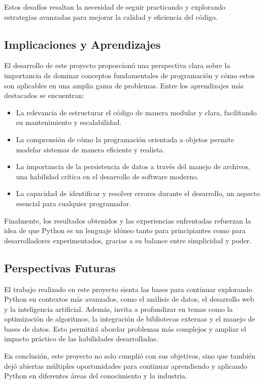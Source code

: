 \documentclass[conference]{IEEEtran}
\begin{document}
Estos desafíos resaltan la necesidad de seguir practicando y explorando estrategias avanzadas para mejorar la calidad y eficiencia del código.

\subsection{Implicaciones y Aprendizajes}
El desarrollo de este proyecto proporcionó una perspectiva clara sobre la importancia de dominar conceptos fundamentales de programación y cómo estos son aplicables en una amplia gama de problemas. Entre los aprendizajes más destacados se encuentran:

\begin{itemize}
    \item La relevancia de estructurar el código de manera modular y clara, facilitando su mantenimiento y escalabilidad.
    \item La comprensión de cómo la programación orientada a objetos permite modelar sistemas de manera eficiente y realista.
    \item La importancia de la persistencia de datos a través del manejo de archivos, una habilidad crítica en el desarrollo de software moderno.
    \item La capacidad de identificar y resolver errores durante el desarrollo, un aspecto esencial para cualquier programador.
\end{itemize}

Finalmente, los resultados obtenidos y las experiencias enfrentadas refuerzan la idea de que Python es un lenguaje idóneo tanto para principiantes como para desarrolladores experimentados, gracias a su balance entre simplicidad y poder.

\subsection{Perspectivas Futuras}
El trabajo realizado en este proyecto sienta las bases para continuar explorando Python en contextos más avanzados, como el análisis de datos, el desarrollo web y la inteligencia artificial. Además, invita a profundizar en temas como la optimización de algoritmos, la integración de bibliotecas externas y el manejo de bases de datos. Esto permitirá abordar problemas más complejos y ampliar el impacto práctico de las habilidades desarrolladas.

En conclusión, este proyecto no solo cumplió con sus objetivos, sino que también dejó abiertas múltiples oportunidades para continuar aprendiendo y aplicando Python en diferentes áreas del conocimiento y la industria.
\end{document}
